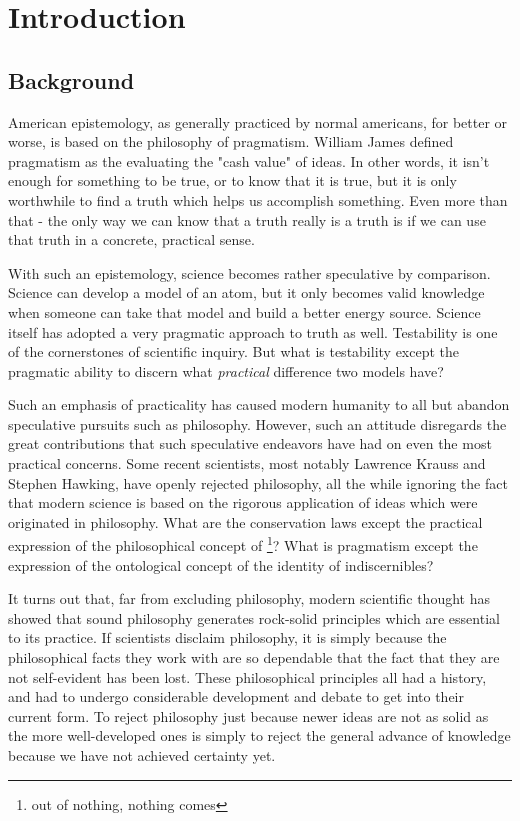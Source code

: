 \chapter*{Introduction}

\section{Background}
American epistemology, as generally practiced by normal americans, for better or worse, is based on the philosophy of pragmatism.  William James defined pragmatism as the evaluating the "cash value" of ideas.  In other words, it isn't enough for something to be true, or to know that it is true, but it is only worthwhile to find a truth which helps us accomplish something.  Even more than that - the only way we can know that a truth really is a truth is if we can use that truth in a concrete, practical sense.

With such an epistemology, science becomes rather speculative by comparison.  Science can develop a model of an atom, but it only becomes valid knowledge when someone can take that model and build a better energy source.  Science itself has adopted a very pragmatic approach to truth as well.  Testability is one of the cornerstones of scientific inquiry.  But what is testability except the pragmatic ability to discern what \emph{practical} difference two models have?

Such an emphasis of practicality has caused modern humanity to all but abandon speculative pursuits such as philosophy.  However, such an attitude disregards the great contributions that such speculative endeavors have had on even the most practical concerns.  Some recent scientists, most notably Lawrence Krauss and Stephen Hawking, have openly rejected philosophy, all the while ignoring the fact that modern science is based on the rigorous application of ideas which were originated in philosophy.  What are the conservation laws except the practical expression of the philosophical concept of \footnote{out of nothing, nothing comes}?  What is pragmatism except the expression of the ontological concept of the identity of indiscernibles?

It turns out that, far from excluding philosophy, modern scientific thought has showed that sound philosophy generates rock-solid principles which are essential to its practice.  If scientists disclaim philosophy, it is simply because the philosophical facts they work with are so dependable that the fact that they are not self-evident has been lost.  These philosophical principles all had a history, and had to undergo considerable development and debate to get into their current form.  To reject philosophy just because newer ideas are not as solid as the more well-developed ones is simply to reject the general advance of knowledge because we have not achieved certainty yet.

